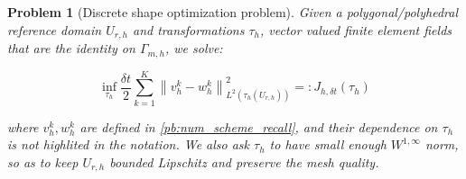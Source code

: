 \documentclass[english,a4paper,9pt,oneside]{scrbook}	%
\theoremstyle{break}
\newtheorem{pb}[equation]{Problem}
\theoremstyle{remark}
\newcommand{\norm}[1]{\left\lVert#1\right\rVert}
\begin{document}
\begin{pb}[Discrete shape optimization problem]
\label{pb:discr_shopt}
Given a polygonal/polyhedral reference domain $U_{r,h}$ and transformations $\tau_h$, vector valued finite element fields that are the identity on $\Gamma_{m,h}$, we solve:

$$\inf_{\tau_h }\frac{\delta t}{2}\sum_{k=1}^{K}\norm{v_h^k-w^k_h}_{L^2(\tau_h(U_{r,h}))}^2=:J_{h,\delta t}(\tau_h)$$


where $v_h^k, w^k_h$ are defined in \cref{pb:num_scheme_recall}, and their dependence on $\tau_h$ is not highlited in the notation. We also ask $\tau_h$ to have small enough $W^{1,\infty}$ norm, so as to keep $U_{r,h}$ bounded Lipschitz and preserve the mesh quality.

\end{pb}
\end{document}
